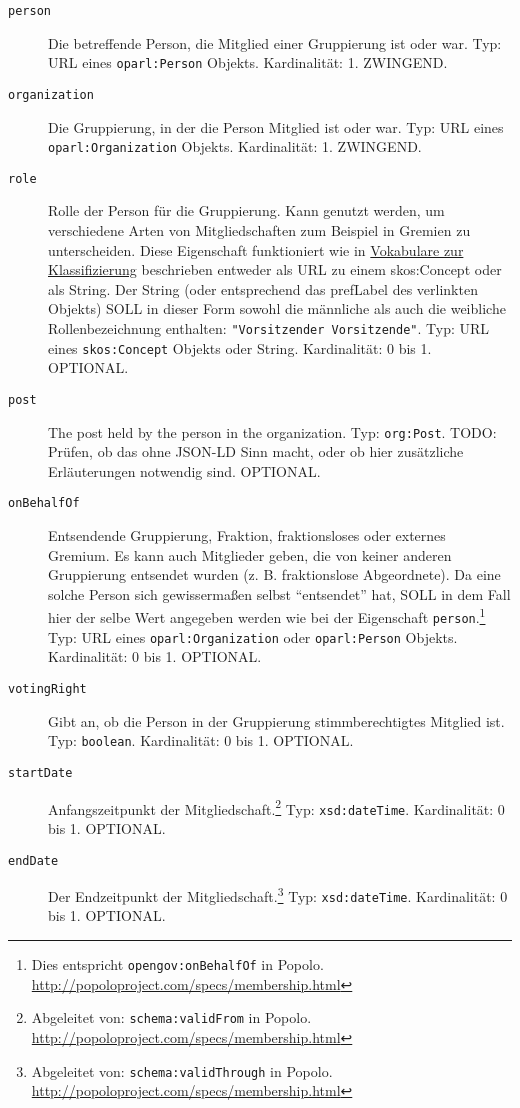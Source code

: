 \documentclass[,a4paper]{article}
\begin{document}
\begin{description}
\item[\texttt{person}]
Die betreffende Person, die Mitglied einer Gruppierung ist oder war.
Typ: URL eines \texttt{oparl:Person} Objekts. Kardinalität: 1. ZWINGEND.
\item[\texttt{organization}]
Die Gruppierung, in der die Person Mitglied ist oder war. Typ: URL eines
\texttt{oparl:Organization} Objekts. Kardinalität: 1. ZWINGEND.
\item[\texttt{role}]
Rolle der Person für die Gruppierung. Kann genutzt werden, um
verschiedene Arten von Mitgliedschaften zum Beispiel in Gremien zu
unterscheiden. Diese Eigenschaft funktioniert wie in
\hyperref[vokabulareux5fklassifizierung]{Vokabulare zur Klassifizierung}
beschrieben entweder als URL zu einem skos:Concept oder als String. Der
String (oder entsprechend das prefLabel des verlinkten Objekts) SOLL in
dieser Form sowohl die männliche als auch die weibliche
Rollenbezeichnung enthalten:
\texttt{"Vorsitzender \textbar{} Vorsitzende"}. Typ: URL eines
\texttt{skos:Concept} Objekts oder String. Kardinalität: 0 bis 1.
OPTIONAL.
\item[\texttt{post}]
The post held by the person in the organization. Typ: \texttt{org:Post}.
TODO: Prüfen, ob das ohne JSON-LD Sinn macht, oder ob hier zusätzliche
Erläuterungen notwendig sind. OPTIONAL.
\item[\texttt{onBehalfOf}]
Entsendende Gruppierung, Fraktion, fraktionsloses oder externes Gremium.
Es kann auch Mitglieder geben, die von keiner anderen Gruppierung
entsendet wurden (z. B. fraktionslose Abgeordnete). Da eine solche
Person sich gewissermaßen selbst ``entsendet'' hat, SOLL in dem Fall
hier der selbe Wert angegeben werden wie bei der Eigenschaft
\texttt{person}.\footnote{Dies entspricht \texttt{opengov:onBehalfOf} in
  Popolo. \url{http://popoloproject.com/specs/membership.html}} Typ: URL
eines \texttt{oparl:Organization} oder \texttt{oparl:Person} Objekts.
Kardinalität: 0 bis 1. OPTIONAL.
\item[\texttt{votingRight}]
Gibt an, ob die Person in der Gruppierung stimmberechtigtes Mitglied
ist. Typ: \texttt{boolean}. Kardinalität: 0 bis 1. OPTIONAL.
\item[\texttt{startDate}]
Anfangszeitpunkt der Mitgliedschaft.\footnote{Abgeleitet von:
  \texttt{schema:validFrom} in Popolo.
  \url{http://popoloproject.com/specs/membership.html}} Typ:
\texttt{xsd:dateTime}. Kardinalität: 0 bis 1. OPTIONAL.
\item[\texttt{endDate}]
Der Endzeitpunkt der Mitgliedschaft.\footnote{Abgeleitet von:
  \texttt{schema:validThrough} in Popolo.
  \url{http://popoloproject.com/specs/membership.html}} Typ:
\texttt{xsd:dateTime}. Kardinalität: 0 bis 1. OPTIONAL.
\end{description}
\end{document}
